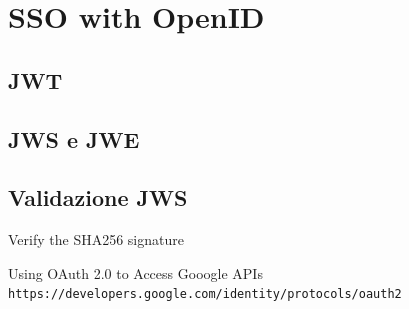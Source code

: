 \documentclass{style}
\begin{document}
\section{SSO with OpenID}
\subsection{JWT}
\subsection{JWS e JWE}
\subsection{Validazione JWS}
Verify the SHA256 signature

\begin{thebibliography}{9}
    Using OAuth 2.0 to Access Gooogle APIs
    \\\texttt{https://developers.google.com/identity/protocols/oauth2}
\end{thebibliography}

\newpage
\end{document}
